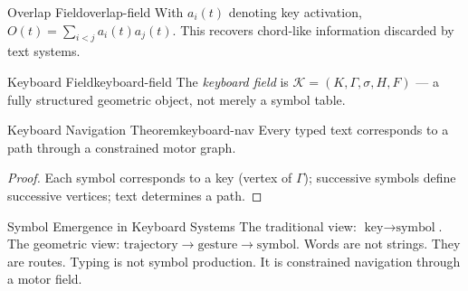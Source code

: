 \begin{definition}{Overlap Field}{overlap-field}
  With $a_i(t)$ denoting key activation, $O(t) = \sum_{i<j} a_i(t) a_j(t)$.
  This recovers chord-like information discarded by text systems.
\end{definition}

\begin{definition}{Keyboard Field}{keyboard-field}
  The \emph{keyboard field} is
  $\mathcal{K} = (K, \Gamma, \sigma, H, F)$ — a fully structured
  geometric object, not merely a symbol table.
\end{definition}

\begin{theorem}{Keyboard Navigation Theorem}{keyboard-nav}
  Every typed text corresponds to a path through a constrained motor graph.
\end{theorem}
\begin{proof}
  Each symbol corresponds to a key (vertex of $\Gamma$); successive
  symbols define successive vertices; text determines a path.
\end{proof}

\begin{namedthm}{Symbol Emergence in Keyboard Systems}
  The traditional view: $\text{key} \to \text{symbol}$.
  The geometric view: $\text{trajectory} \to \text{gesture} \to \text{symbol}$.
  Words are not strings. They are routes. Typing is not symbol production.
  It is constrained navigation through a motor field.
\end{namedthm}
